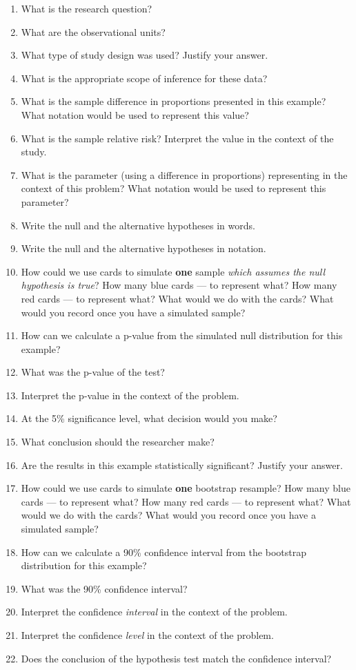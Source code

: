 \documentclass[
]{report}
\newcommand{\rgs}{\vspace{12pt}} %
\begin{document}
\begin{enumerate}
\def\labelenumi{\arabic{enumi}.}
\item
  What is the research question?
  \rgs
\item
  What are the observational units?
  \rgs
\item
  What type of study design was used? Justify your answer.
  \rgs
\item
  What is the appropriate scope of inference for these data?
  \rgs
\item
  What is the sample difference in proportions presented in this example? What notation would be used to represent this value?
  \rgs
\item
  What is the sample relative risk? Interpret the value in the context of the study.
  \rgs
  \rgs
\item
  What is the parameter (using a difference in proportions) representing in the context of this problem? What notation would be used to represent this parameter?
  \rgs
  \rgs
\item
  Write the null and the alternative hypotheses in words.
  \rgs
  \rgs
\item
  Write the null and the alternative hypotheses in notation.
  \rgs
\item
  How could we use cards to simulate \textbf{one} sample \emph{which assumes the null hypothesis is true}? How many blue cards --- to represent what? How many red cards --- to represent what? What would we do with the cards? What would you record once you have a simulated sample?
  \rgs
  \rgs
  \rgs
\item
  How can we calculate a p-value from the simulated null distribution for this example?
  \rgs
  \rgs
\item
  What was the p-value of the test?
  \rgs
\item
  Interpret the p-value in the context of the problem.
  \rgs
  \rgs
\item
  At the 5\% significance level, what decision would you make?
  \rgs
\item
  What conclusion should the researcher make?
  \rgs
  \rgs
\item
  Are the results in this example statistically significant? Justify your answer.
  \rgs
\item
  How could we use cards to simulate \textbf{one} bootstrap resample? How many blue cards --- to represent what? How many red cards --- to represent what? What would we do with the cards? What would you record once you have a simulated sample?
  \rgs
  \rgs
  \rgs
\item
  How can we calculate a 90\% confidence interval from the bootstrap distribution for this example?
  \rgs
\item
  What was the 90\% confidence interval?
  \rgs
\item
  Interpret the confidence \emph{interval} in the context of the problem.
  \rgs
  \rgs
\item
  Interpret the confidence \emph{level} in the context of the problem.
  \rgs
  \rgs
\item
  Does the conclusion of the hypothesis test match the confidence interval?
  \rgs
\end{enumerate}
\end{document}
